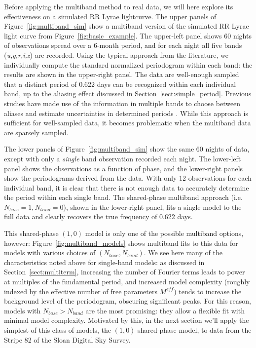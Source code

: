 \documentclass{emulateapj}
\newcommand{\Fig}[1]{Figure~\ref{fig:#1}}
\newcommand{\fig}[1]{\Fig{#1}}
\newcommand{\Sect}[1]{Section~\ref{sect:#1}}
\newcommand{\sect}[1]{\Sect{#1}}
\begin{document}
Before applying the multiband method to real data, we will here explore its effectiveness on a simulated RR Lyrae lightcurve.
The upper panels of \fig{multiband_sim} show a multiband version of the simulated RR Lyrae light curve from \fig{basic_example}.
The upper-left panel shows 60 nights of observations spread over a 6-month period, and for each night all five bands ({\it u,g,r,i,z}) are recorded.
Using the typical approach from the literature, we individually compute the standard normalized periodogram within each band: the results are shown in the upper-right panel.
The data are well-enough sampled that a distinct period of 0.622 days can be recognized within each individual band, up to the aliasing effect discussed in \sect{simple_period}.
Previous studies have made use of the information in multiple bands to choose between aliases and estimate uncertainties in determined periods \citep[e.g.][]{Oluseyi12,Sesar2010}.
While this approach is sufficient for well-sampled data, it becomes problematic when the multiband data are sparsely sampled.

The lower panels of \fig{multiband_sim} show the same 60 nights of data, except with only a {\it single} band observation recorded each night.
The lower-left panel shows the observations as a function of phase, and the lower-right panels show the periodograms derived from the data.
With only 12 observations for each individual band, it is clear that there is not enough data to accurately determine the period within each single band. The shared-phase multiband approach (i.e. $N_{base}=1,N_{band}=0$), shown in the lower-right panel, fits a single model to the full data and clearly recovers the true frequency of 0.622 days.

This shared-phase $(1,0)$ model is only one of the possible multiband options, however: \fig{multiband_models} shows multiband fits to this data for models with various choices of $(N_{base},N_{band})$.
We see here many of the characteristics noted above for single-band models: as discussed in \sect{multiterm}, increasing the number of Fourier terms leads to power at multiples of the fundamental period, and increased model complexity (roughly indexed by the effective number of free parameters $M^{eff}$) tends to increase the background level of the periodogram, obscuring significant peaks.
For this reason, models with $N_{base} > N_{band}$ are the most promising: they allow a flexible fit with minimal model complexity. Motivated by this, in the next section we'll apply the simplest of this class of models, the $(1, 0)$ shared-phase model, to data from the Stripe 82 of the Sloan Digital Sky Survey.
\end{document}
